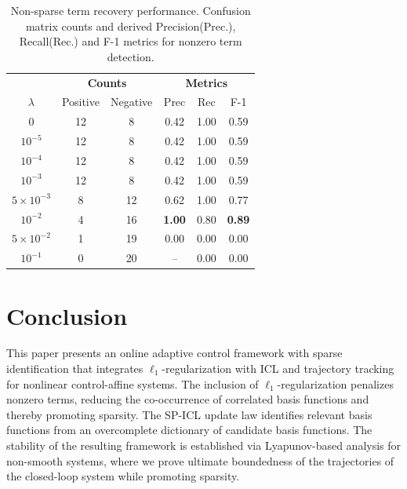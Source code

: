 \documentclass[conference]{ieeeconf}
\begin{document}
\begin{table}[t]
\centering
\caption{Non-sparse term recovery performance. Confusion matrix counts and derived Precision(Prec.), Recall(Rec.) and F-1 metrics for nonzero term detection.}
\label{tab:confusion_results}
\setlength{\tabcolsep}{5pt}
\renewcommand{\arraystretch}{1.15}

\begin{tabular}{c|cc|ccc}
\toprule
& \multicolumn{2}{c|}{\textbf{Counts}} 
& \multicolumn{3}{c}{\textbf{Metrics}} \\
$\lambda$ 
& Positive & Negative 
& Prec & Rec & F-1 \\
\midrule

0 
& 12 & 8 
& 0.42 & 1.00 & 0.59 \\

$10^{-5}$ 
& 12 & 8 
& 0.42 & 1.00 & 0.59 \\

$10^{-4}$ 
& 12 & 8 
& 0.42 & 1.00 & 0.59 \\

$10^{-3}$ 
& 12 & 8 
& 0.42 & 1.00 & 0.59 \\

$5\times10^{-3}$ 
& 8 & 12 
& 0.62 & 1.00 & 0.77 \\

$10^{-2}$ 
& 4 & 16 
& \textbf{1.00} & 0.80 & \textbf{0.89} \\

$5\times10^{-2}$ 
& 1 & 19 
& 0.00 & 0.00 & 0.00 \\

$10^{-1}$ 
& 0 & 20 
& -- & 0.00 & 0.00 \\

\bottomrule
\end{tabular}
\end{table}

\section{Conclusion}
This paper presents an online adaptive control framework with sparse identification that integrates $\ell_1$-regularization with ICL and trajectory tracking for nonlinear control-affine systems. The inclusion of $\ell_1$-regularization penalizes nonzero terms, reducing the co-occurrence of correlated basis functions and thereby promoting sparsity. The SP-ICL update law identifies relevant basis functions from an overcomplete dictionary of candidate basis functions. The stability of the resulting framework is established via Lyapunov-based analysis for non-smooth systems, where we prove ultimate boundedness of the trajectories of the closed-loop system while promoting sparsity.
\end{document}

